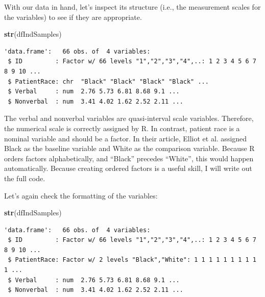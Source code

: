 \documentclass[
  11pt,
]{book}
\newenvironment{Shaded}{\begin{snugshade}}{\end{snugshade}}
\newcommand{\AttributeTok}[1]{\textcolor[rgb]{0.27,0.27,0.27}{#1}}
\newcommand{\FunctionTok}[1]{\textcolor[rgb]{0.27,0.27,0.27}{\textbf{#1}}}
\newcommand{\NormalTok}[1]{#1}
\newcommand{\OtherTok}[1]{\textcolor[rgb]{0.37,0.37,0.37}{#1}}
\newcommand{\SpecialCharTok}[1]{\textcolor[rgb]{0.43,0.43,0.43}{\textbf{#1}}}
\newcommand{\StringTok}[1]{\textcolor[rgb]{0.5,0.5,0.5}{#1}}
\begin{document}
With our data in hand, let's inspect its structure (i.e., the measurement scales for the variables) to see if they are appropriate.

\begin{Shaded}
\begin{Highlighting}[]
\FunctionTok{str}\NormalTok{(dfIndSamples)}
\end{Highlighting}
\end{Shaded}

\begin{verbatim}
'data.frame':   66 obs. of  4 variables:
 $ ID         : Factor w/ 66 levels "1","2","3","4",..: 1 2 3 4 5 6 7 8 9 10 ...
 $ PatientRace: chr  "Black" "Black" "Black" "Black" ...
 $ Verbal     : num  2.76 5.73 6.81 8.68 9.1 ...
 $ Nonverbal  : num  3.41 4.02 1.62 2.52 2.11 ...
\end{verbatim}

The verbal and nonverbal variables are quasi-interval scale variables. Therefore, the numerical scale is correctly assigned by R. In contrast, patient race is a nominal variable and should be a factor. In their article, Elliot et al. \citeyearpar{elliott_differences_2016} assigned Black as the baseline variable and White as the comparison variable. Because R orders factors alphabetically, and ``Black'' precedes ``White'', this would happen automatically. Because creating ordered factors is a useful skill, I will write out the full code.

\begin{Shaded}
\end{Shaded}

Let's again check the formatting of the variables:

\begin{Shaded}
\begin{Highlighting}[]
\FunctionTok{str}\NormalTok{(dfIndSamples)}
\end{Highlighting}
\end{Shaded}

\begin{verbatim}
'data.frame':   66 obs. of  4 variables:
 $ ID         : Factor w/ 66 levels "1","2","3","4",..: 1 2 3 4 5 6 7 8 9 10 ...
 $ PatientRace: Factor w/ 2 levels "Black","White": 1 1 1 1 1 1 1 1 1 1 ...
 $ Verbal     : num  2.76 5.73 6.81 8.68 9.1 ...
 $ Nonverbal  : num  3.41 4.02 1.62 2.52 2.11 ...
\end{verbatim}
\end{document}
